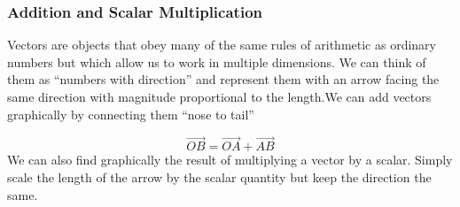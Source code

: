 \documentclass[11pt,titlepage]{article}
\numberwithin{equation}{section}
\begin{document}
\subsubsection{Addition and Scalar Multiplication}
Vectors are objects that obey many of the same rules of arithmetic as ordinary numbers but which allow us to work in multiple dimensions. We can think of them as “numbers with direction” and represent them with an arrow facing the same direction with magnitude proportional to the length.We can add vectors graphically by connecting them “nose to tail”
\begin{tcolorbox}
\centering
{}
\end{tcolorbox}
\begin{equation}
    \overrightarrow{OB}=\overrightarrow{OA}+\overrightarrow{AB}
\end{equation}
We can also find graphically the result of multiplying a vector by a scalar. Simply scale the
length of the arrow by the scalar quantity but keep the direction the same.
\begin{tcolorbox}
    \centering
{}
\end{tcolorbox}
\end{document}
